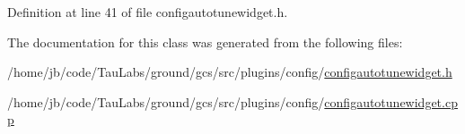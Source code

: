 \-Definition at line 41 of file configautotunewidget.\-h.



\-The documentation for this class was generated from the following files\-:\begin{DoxyCompactItemize}
\item 
/home/jb/code/\-Tau\-Labs/ground/gcs/src/plugins/config/\hyperlink{configautotunewidget_8h}{configautotunewidget.\-h}\item 
/home/jb/code/\-Tau\-Labs/ground/gcs/src/plugins/config/\hyperlink{configautotunewidget_8cpp}{configautotunewidget.\-cpp}\end{DoxyCompactItemize}
